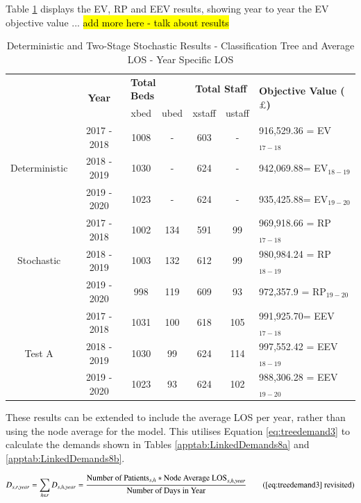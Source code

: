 \documentclass[../thesis.tex]{subfiles}
\begin{document}
Table \ref{tab:Results7} displays the EV, RP and EEV results, showing year to year the EV objective value ...
\hl{add more here - talk about results}
\begin{table}[h!]
    \centering
    \begin{tabular}{ccccccl}\toprule
 & \multirow{2}{*}{\textbf{Year}}& \multicolumn{2}{l}{\textbf{Total Beds}} & \multicolumn{2}{c}{\textbf{Total Staff}} & \multirow{2}{*}{\textbf{Objective Value ($\pounds$)}}\\ \cmidrule(lr){3-4} \cmidrule(lr){5-6}
&& xbed           & ubed          & xstaff         & ustaff         \\ \midrule
     \multirow{3}{*}{Deterministic} & 2017 - 2018 & 1008  & - & 603 & - & 916,529.36 =  EV$_{17-18}$ \\ 
      & 2018 - 2019 & 1030& - & 624  & - &  942,069.88=  EV$_{18-19}$ \\
      & 2019 - 2020 & 1023  & - & 624 & - &   935,425.88=  EV$_{19-20}$\\ \midrule
     \multirow{3}{*}{Stochastic} & 2017 - 2018 & 1002 & 134 &591  & 99 &  969,918.66 =  RP$_{17-18}$ \\ 
      & 2018 - 2019 & 1003  &  132 & 612 & 99 &980,984.24  =  RP$_{18-19}$ \\
      & 2019 - 2020 &998 &119  &609 &93 &  972,357.9
=  RP$_{19-20}$\\ \midrule    
     \multirow{3}{*}{Test A} & 2017 - 2018 & 1031 & 100 & 618  &105  & 991,925.70=  EEV$_{17-18}$ \\ 
      & 2018 - 2019& 1030 & 99 &  624& 114 & 997,552.42
=  EEV$_{18-19}$ \\
      & 2019 - 2020 & 1023 & 93  & 624 &102 &  988,306.28
=  EEV$_{19-20}$\\ \bottomrule       
    \end{tabular}
    \caption{Deterministic and Two-Stage Stochastic Results - Classification Tree and Average LOS - Year Specific LOS}
    \label{tab:Results7}
\end{table}



These results can be extended to include the average LOS per year, rather than using the node average for the model. This utilises Equation \eqref{eq:treedemand3} to calculate the demands shown in Tables \ref{apptab:LinkedDemands8a} and \ref{apptab:LinkedDemands8b}.

\begin{equation}
        D_{s,r,year} = \sum\limits_{h \in r} D_{s,h,year} = \frac{\text{Number of Patients}_{s,h}*\text{Node Average LOS}_{s,h,year}}{\text{Number of Days in Year}} \tag{\ref{eq:treedemand3} revisited}
\end{equation}
\end{document}

